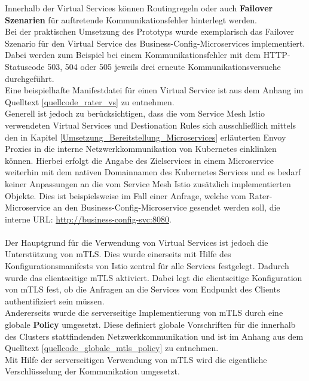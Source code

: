 Innerhalb der Virtual Services können Routingregeln oder auch \textbf{Failover Szenarien} für auftretende Kommunikationsfehler hinterlegt werden.\\
Bei der praktischen Umsetzung des Prototyps wurde exemplarisch das Failover Szenario für den Virtual Service des Business-Config-Microservices implementiert. Dabei werden zum Beispiel bei einem Kommunikationsfehler mit dem \ac{HTTP}-Statuscode 503, 504 oder 505 jeweils drei erneute Kommunikationsversuche durchgeführt.\\
Eine beispielhafte Manifestdatei für einen Virtual Service ist aus dem Anhang im Quelltext \ref{quellcode_rater_vs} zu entnehmen.\\
\newpage
Generell ist jedoch zu berücksichtigen, dass die vom Service Mesh Istio verwendeten Virtual Services und Destionation Rules sich ausschließlich mittels den in Kapitel \ref{Umsetzung_Bereitstellung_Microservices} erläuterten Envoy Proxies in die interne Netzwerkkommunikation von Kubernetes einklinken können. Hierbei erfolgt die Angabe des Zielservices in einem Microservice weiterhin mit dem nativen Domainnamen des Kubernetes Services und es bedarf keiner Anpassungen an die vom Service Mesh Istio zusätzlich implementierten Objekte. Dies ist beispielsweise im Fall einer Anfrage, welche vom Rater-Microservice an den Business-Config-Microservice gesendet werden soll, die interne \ac{URL}: \url{http://business-config-svc:8080}.\\
\\
Der Hauptgrund für die Verwendung von Virtual Services ist jedoch die Unterstützung von \ac{mTLS}. Dies wurde einerseits mit Hilfe des Konfigurationsmanifests von Istio zentral für alle Services festgelegt. Dadurch wurde das clientseitige \ac{mTLS} aktiviert. Dabei legt die clientseitige Konfiguration von \ac{mTLS} fest, ob die Anfragen an die Services vom Endpunkt des Clients authentifiziert sein müssen.\\
Andererseits wurde die serverseitige Implementierung von \ac{mTLS} durch eine globale \textbf{Policy} umgesetzt. Diese definiert globale Vorschriften für die innerhalb des Clusters stattfindenden Netzwerkkommunikation und ist im Anhang aus dem Quelltext \ref{quellcode_globale_mtls_policy} zu entnehmen. \\
Mit Hilfe der serverseitigen Verwendung von \ac{mTLS} wird die eigentliche Verschlüsselung der Kommunikation umgesetzt.\autocite[Vgl.][Authentication policies]{IstioAuthors.20200106}\\
\\
